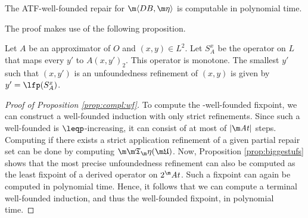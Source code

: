 \begin{proposition}\label{prop:compl:wf}
  The ATF-well-founded repair for $\fulldb$ is computable in polynomial time.
\end{proposition}

The proof makes use of the following proposition. 
\begin{proposition}\label{prop:biggestufs}
Let $A$ be an approximator of $O$ and $(x,y)\in L^2$. 
Let $S_A^x$ be the operator on $L$ that maps every $y'$ to $A(x,y')_2$.
This operator is monotone. 
The smallest $y'$ such that $(x,y')$ is an unfoundedness refinement of $(x,y)$ is given by 
$y'=\lfp (S_A^x)$.
 \end{proposition}
 \begin{proof}[Proof of Proposition \ref{prop:compl:wf}]
 To compute the \Ap-well-founded fixpoint, we can construct a well-founded induction with only strict refinements. 
 Since such a well-founded is $\leqp$-increasing, it can consist of at most of $|\atoms|$ steps. 
 Computing if there exists a strict application refinement of a given partial repair set \UUU
can be done by computing $\Ap(\UUU)$. Now, Proposition \ref{prop:biggestufs} shows that the most precise unfoundedness refinement can also be computed as the least fixpoint of a derived operator on $2^\atoms$. Such a fixpoint can again be computed in polynomial time. Hence, it follows that we can compute a terminal well-founded induction, and thus the well-founded fixpoint, in polynomial time. 
%  
\end{proof}

